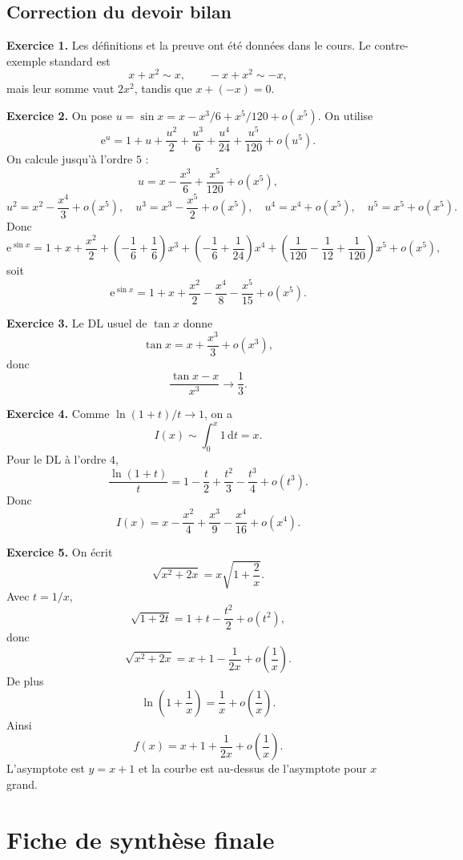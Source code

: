 \documentclass[11pt,a4paper]{article}
\newcommand{\e}{\mathrm{e}}
\newcommand{\dd}{\mathrm{d}}
\begin{document}
\subsection*{Correction du devoir bilan}

\textbf{Exercice 1.} Les définitions et la preuve ont été données dans le cours. Le contre-exemple standard est
\[
  x+x^2\sim x,
  \qquad
  -x+x^2\sim -x,
\]
mais leur somme vaut $2x^2$, tandis que $x+(-x)=0$.

\textbf{Exercice 2.} On pose $u=\sin x=x-x^3/6+x^5/120+o(x^5)$. On utilise
\[
  \e^u=1+u+\frac{u^2}{2}+\frac{u^3}{6}+\frac{u^4}{24}+\frac{u^5}{120}+o(u^5).
\]
On calcule jusqu'à l'ordre $5$ :
\[
 u=x-\frac{x^3}{6}+\frac{x^5}{120}+o(x^5),
\]
\[
 u^2=x^2-\frac{x^4}{3}+o(x^5),
\quad
 u^3=x^3-\frac{x^5}{2}+o(x^5),
\quad
 u^4=x^4+o(x^5),
\quad
 u^5=x^5+o(x^5).
\]
Donc
\[
\e^{\sin x}=1+x+\frac{x^2}{2}+\left(-\frac16+\frac16\right)x^3
+\left(-\frac16+\frac1{24}\right)x^4
+\left(\frac1{120}-\frac1{12}+\frac1{120}\right)x^5+o(x^5),
\]
soit
\[
  \boxed{\e^{\sin x}=1+x+\frac{x^2}{2}-\frac{x^4}{8}-\frac{x^5}{15}+o(x^5).}
\]

\textbf{Exercice 3.} Le DL usuel de $\tan x$ donne
\[
  \tan x=x+\frac{x^3}{3}+o(x^3),
\]
donc
\[
  \frac{\tan x-x}{x^3}\to\frac13.
\]

\textbf{Exercice 4.} Comme $\ln(1+t)/t\to1$, on a
\[
  I(x)\sim\int_0^x1\,\dd t=x.
\]
Pour le DL à l'ordre $4$,
\[
  \frac{\ln(1+t)}{t}=1-\frac t2+\frac{t^2}{3}-\frac{t^3}{4}+o(t^3).
\]
Donc
\[
  \boxed{I(x)=x-\frac{x^2}{4}+\frac{x^3}{9}-\frac{x^4}{16}+o(x^4).}
\]

\textbf{Exercice 5.} On écrit
\[
  \sqrt{x^2+2x}=x\sqrt{1+\frac2x}.
\]
Avec $t=1/x$,
\[
  \sqrt{1+2t}=1+t-\frac{t^2}{2}+o(t^2),
\]
donc
\[
  \sqrt{x^2+2x}=x+1-\frac1{2x}+o\left(\frac1x\right).
\]
De plus
\[
  \ln\left(1+\frac1x\right)=\frac1x+o\left(\frac1x\right).
\]
Ainsi
\[
  f(x)=x+1+\frac1{2x}+o\left(\frac1x\right).
\]
L'asymptote est $y=x+1$ et la courbe est au-dessus de l'asymptote pour $x$ grand.

\section{Fiche de synthèse finale}
\end{document}
